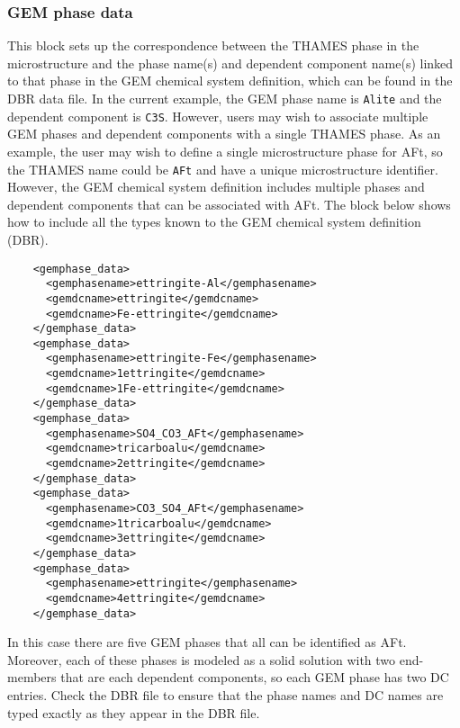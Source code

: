 \documentclass{article}
\begin{document}
\subsubsection{GEM phase data}
This block sets up the correspondence between the THAMES phase in the
microstructure and the phase name(s) and dependent component name(s) linked to that
phase in the GEM chemical system definition, which can be found in the DBR data
file.  In the current example, the GEM phase name is \texttt{Alite} and the
dependent component is \texttt{C3S}.  However, users may wish to associate
multiple GEM phases and dependent components with a single THAMES phase.  As an
example, the user may wish to define a single microstructure phase for
AFt, so the THAMES name could be \texttt{AFt} and have a unique microstructure
identifier.  However, the GEM chemical system definition includes multiple
phases and dependent components that can be associated with AFt.  The block
below shows how to include all the types known to the GEM chemical system
definition (DBR).

\begin{lstlisting}
    <gemphase_data>
      <gemphasename>ettringite-Al</gemphasename>
      <gemdcname>ettringite</gemdcname>
      <gemdcname>Fe-ettringite</gemdcname>
    </gemphase_data>
    <gemphase_data>
      <gemphasename>ettringite-Fe</gemphasename>
      <gemdcname>1ettringite</gemdcname>
      <gemdcname>1Fe-ettringite</gemdcname>
    </gemphase_data>
    <gemphase_data>
      <gemphasename>SO4_CO3_AFt</gemphasename>
      <gemdcname>tricarboalu</gemdcname>
      <gemdcname>2ettringite</gemdcname>
    </gemphase_data>
    <gemphase_data>
      <gemphasename>CO3_SO4_AFt</gemphasename>
      <gemdcname>1tricarboalu</gemdcname>
      <gemdcname>3ettringite</gemdcname>
    </gemphase_data>
    <gemphase_data>
      <gemphasename>ettringite</gemphasename>
      <gemdcname>4ettringite</gemdcname>
    </gemphase_data>
\end{lstlisting}

In this case there are five GEM phases that all can be identified as AFt. 
Moreover, each of these phases is modeled as a solid solution with two
end-members that are each dependent components, so each GEM phase has two
DC entries.  Check the DBR file to ensure that the phase names and DC names
are typed exactly as they appear in the DBR file.
\end{document}
